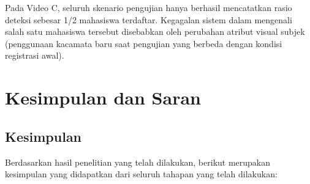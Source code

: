 \documentclass[conference]{IEEEtran}
\begin{document}
Pada Video C, seluruh skenario pengujian hanya berhasil mencatatkan rasio deteksi sebesar 1/2 mahasiswa terdaftar. Kegagalan sistem dalam mengenali salah satu mahasiswa tersebut disebabkan oleh perubahan atribut visual subjek (penggunaan kacamata baru saat pengujian yang berbeda dengan kondisi registrasi awal).

\section{Kesimpulan dan Saran}

\subsection{Kesimpulan}
Berdasarkan hasil penelitian yang telah dilakukan, berikut merupakan kesimpulan yang didapatkan dari seluruh tahapan yang telah dilakukan:
\end{document}
